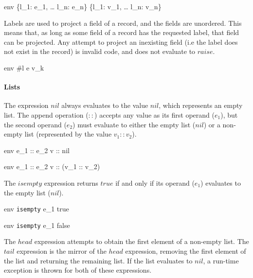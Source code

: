 \documentclass{article}
\begin{document}
    {\mbox{env} \vdash \{l_1: e_1, \; \dots \; l_n: e_n\} \Downarrow \{l_1: v_1, \; \dots \; l_n: v_n\}}

Labels are used to project a field of a record, and the fields are unordered.
This means that, as long as some field of a record has the requested label, that field can be projected.
Any attempt to project an inexisting field (i.e the label does not exist in the record) is invalid code, and does not evaluate to $raise$.

    {\mbox{env} \vdash \#l \; e \Downarrow v_k}


\paragraph{Lists}
The expression $nil$ always evaluates to the value $nil$, which represents an empty list.
The append operation ($::$) accepts any value as its first operand ($e_1$), but the second operand ($e_2$) must evaluate to either the empty list ($nil$) or a non-empty list (represented by the value $v_1 :: v_2$).


    {\mbox{env} \vdash e_1 :: e_2 \Downarrow v :: nil}

    {\mbox{env} \vdash e_1 :: e_2 \Downarrow v :: (v_1 :: v_2)}

The $isempty$ expression returns $true$ if and only if its operand ($e_1$) evaluates to the empty list ($nil$).

    {\mbox{env} \vdash \texttt{isempty} \; e_1 \Downarrow true}

    {\mbox{env} \vdash \texttt{isempty} \; e_1 \Downarrow false}

The $head$ expression attempts to obtain the first element of a non-empty list.
The $tail$ expression is the mirror of the $head$ expression, removing the first element of the list and returning the remaining list.
If the list evaluates to $nil$, a run-time exception is thrown for both of these expressions.
\end{document}
